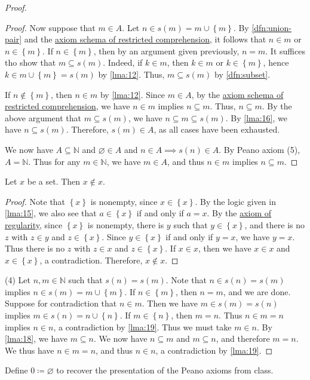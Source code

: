 \documentclass{article}
\begin{document}
\begin{proof}
\begin{proof}
		Now suppose that $m\in A$. Let $n\in s(m) = m \cup \left\{ m \right\} $. By \cref{dfn:union-pair} and the \hyperref[axiom:comprehension]{axiom schema of restricted comprehension}, it follows that $n\in m$ or $n\in \left\{ m \right\} $. If $n\in \left\{ m \right\} $, then by an argument given previously, $n=m$. It suffices tho show that $m\subseteq s(m)$. Indeed, if $k\in m$, then $k\in m$ or $k\in \left\{ m \right\} $, hence $k\in m \cup \left\{ m \right\} =s(m)$ by \cref{lma:12}. Thus, $m \subseteq s(m)$ by \cref{dfn:subset}.

		If $n\notin \left\{ m \right\} $, then $n\in m$ by \cref{lma:12}. Since $m\in A$, by the \hyperref[axiom:comprehension]{axiom schema of restricted comprehension}, we have $n\in m$ implies $n\subseteq m$. Thus, $n\subseteq m$. By the above argument that $m\subseteq s(m)$, we have $n\subseteq m \subseteq s(m)$. By \cref{lma:16}, we have $n \subseteq s(m)$. Therefore, $s(m)\in A$, as all cases have been exhausted.

		We now have $A \subseteq \mathbb{N} $ and $\varnothing \in A$ and $n\in A \implies s(n)\in A$. By Peano axiom (5), $A=\mathbb{N} $. Thus for any $m\in\mathbb{N} $, we have $m\in A$, and thus $n\in m$ implies $n \subseteq m$.
	\end{proof}

	\begin{lemma}\label{lma:19}
		Let $x$ be a set. Then $x\notin x$.
	\end{lemma}
	\begin{proof}
		Note that $\left\{ x \right\} $ is nonempty, since $x\in \left\{ x \right\} $. By the logic given in \cref{lma:15}, we also see that $a\in \left\{ x \right\} $ if and only if $a=x$. By the \hyperref[regularity]{axiom of regularity}, since $\left\{ x \right\}$ is nonempty, there is $y$ such that $y\in \left\{ x \right\} $, and there is no $z$ with $z\in y$ and $z\in \left\{ x \right\} $. Since $y\in \left\{ x \right\} $ if and only if $y=x$, we have $y=x$. Thus there is no $z$ with $z\in x$ and $z\in \left\{ x \right\} $. If $x\in x$, then we have $x\in x$ and $x\in \left\{ x \right\} $, a contradiction. Therefore, $x\notin x$.
	\end{proof}



	(4) Let $n,m\in \mathbb{N} $ such that $s(n) = s(m)$. Note that $n\in s(n)=s(m)$ implies $n\in s(m) = m \cup \left\{ m \right\} $. If $n\in \left\{ m \right\} $, then $n=m$, and we are done. Suppose for contradiction that $n\in m$. Then we have $m\in s(m) = s(n)$ implies $m\in s(n)=n\cup \left\{ n \right\} $. If $m\in \left\{ n \right\} $, then $m=n$. Thus $n\in m = n$ implies $n\in n$, a contradiction by \cref{lma:19}. Thus we must take $m\in n$. By \cref{lma:18}, we have $m\subseteq n$. We now have $n\subseteq m$ and $m\subseteq n$, and therefore $m=n$. We thus have $n\in m =n$, and thus $n\in n$, a contradiction by \cref{lma:19}.
\end{proof}

Define $0\coloneqq \varnothing $ to recover the presentation of the Peano axioms from class.
\end{document}
